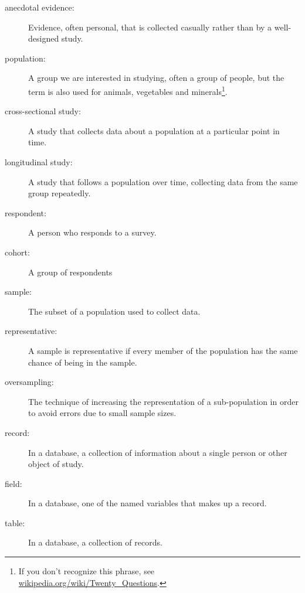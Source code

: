 \documentclass[12pt]{book}
\begin{document}
\begin{description}

\item[anecdotal evidence:] Evidence, often personal, that is collected
  casually rather than by a well-designed study.

\item[population:] A group we are interested in studying, often a
  group of people, but the term is also used for animals, vegetables
  and minerals\footnote{If you don't recognize this phrase, see
    \url{wikipedia.org/wiki/Twenty_Questions}.}.

\item[cross-sectional study:] A study that collects data about a
population at a particular point in time.

\item[longitudinal study:] A study that follows a population over
time, collecting data from the same group repeatedly.

\item[respondent:] A person who responds to a survey.

\item[cohort:] A group of respondents

\item[sample:] The subset of a population used to collect data.

\item[representative:] A sample is representative if every member
of the population has the same chance of being in the sample.

\item[oversampling:] The technique of increasing the representation
of a sub-population in order to avoid errors due to small sample
sizes.

\item[record:] In a database, a collection of information about
a single person or other object of study.

\item[field:] In a database, one of the named variables that makes
up a record.

\item[table:] In a database, a collection of records.


\end{description}
\end{document}

